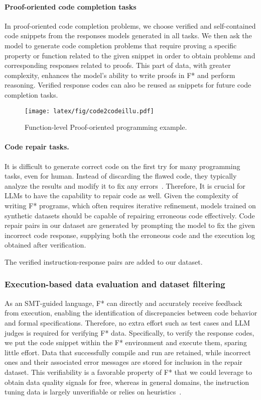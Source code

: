 \paragraph{Proof-oriented code completion tasks}
In proof-oriented code completion problems, we choose verified and self-contained code snippets from the responses models generated in all tasks. We then ask the model to generate code completion problems that require proving a specific property or function related to the given snippet in order to obtain problems and corresponding responses related to proofs. This part of data, with greater complexity, enhances the model’s ability to write proofs in F* and perform reasoning. Verified response codes can also be reused as snippets for future code completion tasks.
\begin{figure}[htbp]
    \centering
    \texttt{[image: latex/fig/code2codeillu.pdf]}
    \caption{Function-level Proof-oriented programming example.}
    \label{fig:code2codeillu}
\end{figure}
\paragraph{Code repair tasks.}
It is difficult to generate correct code on the first try for many programming tasks, even for human. Instead of discarding the flawed code, they typically analyze the results and modify it to fix any errors~\cite{chen2023teachinglargelanguagemodels}. Therefore, It is crucial for LLMs to have the capability to repair code as well.  Given the complexity of writing F* programs, which often requires iterative refinement, models trained on synthetic datasets should be capable of repairing erroneous code effectively. Code repair pairs in our dataset are generated by prompting the model to fix the given incorrect code response, supplying both the erroneous code and the execution log obtained after verification. 


The verified instruction-response pairs are added to our dataset.

\subsubsection{Execution-based data evaluation and dataset filtering}\label{Execution-based data evaluation and dataset filtering}
As an SMT-guided language, F* can directly and accurately receive feedback from execution, enabling the identification of discrepancies between code behavior and formal specifications. Therefore, no extra effort such as test cases and LLM judges is required for verifying F* data. Specifically, to verify the response codes, we put the code snippet within the F* environment and execute them, sparing little effort. Data that successfully compile and run are retained, while incorrect ones and their associated error messages are stored for inclusion in the repair dataset. This verifiability is a favorable property of F* that we could leverage to obtain data quality signals for free, whereas in general domains, the instruction tuning data is largely unverifiable or relies on heuristics~\cite{wei2024selfcodealign}. 

